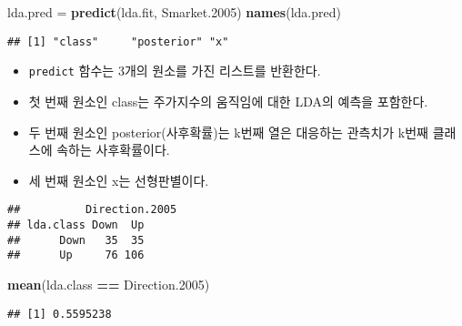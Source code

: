 \documentclass[]{article}
\newenvironment{Shaded}{\begin{snugshade}}{\end{snugshade}}
\newcommand{\KeywordTok}[1]{\textcolor[rgb]{0.13,0.29,0.53}{\textbf{#1}}}
\newcommand{\DecValTok}[1]{\textcolor[rgb]{0.00,0.00,0.81}{#1}}
\newcommand{\StringTok}[1]{\textcolor[rgb]{0.31,0.60,0.02}{#1}}
\newcommand{\OperatorTok}[1]{\textcolor[rgb]{0.81,0.36,0.00}{\textbf{#1}}}
\newcommand{\NormalTok}[1]{#1}
\providecommand{\tightlist}{%
  \setlength{\itemsep}{0pt}\setlength{\parskip}{0pt}}
\begin{document}
\begin{Shaded}
\begin{Highlighting}[]
\NormalTok{lda.pred =}\StringTok{ }\KeywordTok{predict}\NormalTok{(lda.fit, Smarket.}\DecValTok{2005}\NormalTok{)}
\KeywordTok{names}\NormalTok{(lda.pred)}
\end{Highlighting}
\end{Shaded}

\begin{verbatim}
## [1] "class"     "posterior" "x"
\end{verbatim}

\begin{itemize}
\tightlist
\item
  \texttt{predict} 함수는 3개의 원소를 가진 리스트를 반환한다.
\item
  첫 번째 원소인 class는 주가지수의 움직임에 대한 LDA의 예측을 포함한다.
\item
  두 번째 원소인 posterior(사후확률)는 k번째 열은 대응하는 관측치가
  k번째 클래스에 속하는 사후확률이다.
\item
  세 번째 원소인 x는 선형판별이다.
\end{itemize}

\begin{Shaded}
\end{Shaded}

\begin{verbatim}
##          Direction.2005
## lda.class Down  Up
##      Down   35  35
##      Up     76 106
\end{verbatim}

\begin{Shaded}
\begin{Highlighting}[]
\KeywordTok{mean}\NormalTok{(lda.class }\OperatorTok{==}\StringTok{ }\NormalTok{Direction.}\DecValTok{2005}\NormalTok{)}
\end{Highlighting}
\end{Shaded}

\begin{verbatim}
## [1] 0.5595238
\end{verbatim}
\end{document}
